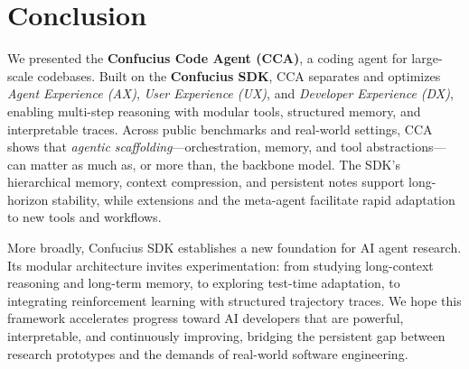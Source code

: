 \section{Conclusion}

We presented the \textbf{Confucius Code Agent (CCA)}, a coding agent for large-scale codebases. Built on the \textbf{Confucius SDK}, CCA separates and optimizes \emph{Agent Experience (AX)}, \emph{User Experience (UX)}, and \emph{Developer Experience (DX)}, enabling multi-step reasoning with modular tools, structured memory, and interpretable traces. Across public benchmarks and real-world settings, CCA shows that \emph{agentic scaffolding}—orchestration, memory, and tool abstractions—can matter as much as, or more than, the backbone model. The SDK’s hierarchical memory, context compression, and persistent notes support long-horizon stability, while extensions and the meta-agent facilitate rapid adaptation to new tools and workflows.

More broadly, Confucius SDK establishes a new foundation for AI agent research. Its modular architecture invites experimentation: from studying long-context reasoning and long-term memory, to exploring test-time adaptation, to integrating reinforcement learning with structured trajectory traces. We hope this framework accelerates progress toward AI developers that are powerful, interpretable, and continuously improving, bridging the persistent gap between research prototypes and the demands of real-world software engineering.
